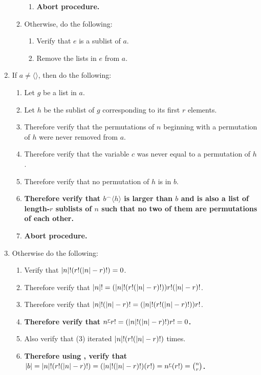 \documentclass[twocolumn]{article}
\let\div\relax
\DeclareMathOperator{\div}{div}
\let\mod\relax
\DeclareMathOperator{\mod}{mod}
\newcommand{\ul}[1]{\underline{#1}}
\newcommand{\procedurehr}[2][]{\hyperref[sec:procedure #2]{\ifthenelse{\equal{#1}{}}{procedure #2}{#1}}}
\begin{document}
\begin{enumerate}
\begin{enumerate}
\begin{enumerate}
							\item \textbf{Abort procedure.}
						\end{enumerate}
						\item Otherwise, do the following:
						\begin{enumerate}
							\item Verify that $e$ is a sublist of $a$.
							\item Remove the lists in $e$ from $a$.
						\end{enumerate}
					\end{enumerate}
					\item If $a\ne\langle\rangle$, then do the following:
					\begin{enumerate}
						\item Let $g$ be a list in $a$.
						\item Let $h$ be the sublist of $g$ corresponding to its first $r$ elements.
						\item Therefore verify that the permutations of $n$ beginning with a permutation of $h$ were never removed from $a$.
						\item Therefore verify that the variable $c$ was never equal to a permutation of $h$.
						\item Therefore verify that no permutation of $h$ is in $b$.
						\item \textbf{Therefore verify that $b^{\frown}\langle h\rangle$ is larger than $b$ and is also a list of length-$r$ sublists of $n$ such that no two of them are permutations of each other.}
						\item \textbf{Abort procedure.}
					\end{enumerate}
					\item Otherwise do the following:
					\begin{enumerate}
						\item Verify that $\lvert n\rvert!\mod(r!(\lvert n\rvert-r)!)=0$.
						\item Therefore verify that $\lvert n\rvert!=(\lvert n\rvert!\div(r!(\lvert n\rvert-r)!))r!(\lvert n\rvert-r)!$.
						\item Therefore verify that $\lvert n\rvert!\div(\lvert n\rvert-r)!=(\lvert n\rvert!\div(r!(\lvert n\rvert-r)!))r!$.
						\item \textbf{Therefore verify that $n^{\ul{r}}\mod r!=(\lvert n\rvert!\div(\lvert n\rvert-r)!)\mod r!=0$.}
						\item Also verify that (3) iterated $\lvert n\rvert!\div(r!(\lvert n\rvert-r)!)$ times.
						\item \textbf{Therefore using \procedurehr{1.08}, verify that $\lvert b\rvert=\lvert n\rvert!\div(r!(\lvert n\rvert-r)!)=(\lvert n\rvert!\div(\lvert n\rvert-r)!)\div(r!)=n^{\ul{r}}\div(r!)=\binom{n}{r}$.}
					\end{enumerate}
				\end{enumerate}
\end{document}
